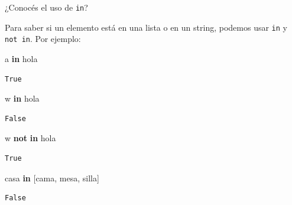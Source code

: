 \documentclass[
  letterpaper,
  DIV=11,
  numbers=noendperiod]{scrreprt}
\newenvironment{Shaded}{\begin{snugshade}}{\end{snugshade}}
\newcommand{\CommentTok}[1]{\textcolor[rgb]{0.37,0.37,0.37}{#1}}
\newcommand{\KeywordTok}[1]{\textcolor[rgb]{0.00,0.23,0.31}{\textbf{#1}}}
\newcommand{\NormalTok}[1]{\textcolor[rgb]{0.00,0.23,0.31}{#1}}
\newcommand{\StringTok}[1]{\textcolor[rgb]{0.13,0.47,0.30}{#1}}
\begin{document}
\begin{tcolorbox}[enhanced jigsaw, opacitybacktitle=0.6, toptitle=1mm, toprule=.15mm, arc=.35mm, breakable, bottomrule=.15mm, opacityback=0, leftrule=.75mm, rightrule=.15mm, title=\textcolor{quarto-callout-tip-color}{\faLightbulb}\hspace{0.5em}{Tip: \texttt{in} y \texttt{not\ in}}, left=2mm, bottomtitle=1mm, colframe=quarto-callout-tip-color-frame, colback=white, titlerule=0mm, coltitle=black, colbacktitle=quarto-callout-tip-color!10!white]

¿Conocés el uso de \texttt{in}?

Para saber si un elemento está en una lista o en un string, podemos usar
\texttt{in} y \texttt{not\ in}. Por ejemplo:

\begin{Shaded}
\begin{Highlighting}[]
\CommentTok{\textquotesingle{}a\textquotesingle{}} \KeywordTok{in} \StringTok{\textquotesingle{}hola\textquotesingle{}}
\end{Highlighting}
\end{Shaded}

\begin{verbatim}
True
\end{verbatim}

\begin{Shaded}
\begin{Highlighting}[]
\CommentTok{\textquotesingle{}w\textquotesingle{}} \KeywordTok{in} \StringTok{\textquotesingle{}hola\textquotesingle{}}
\end{Highlighting}
\end{Shaded}

\begin{verbatim}
False
\end{verbatim}

\begin{Shaded}
\begin{Highlighting}[]
\CommentTok{\textquotesingle{}w\textquotesingle{}} \KeywordTok{not} \KeywordTok{in} \StringTok{\textquotesingle{}hola\textquotesingle{}}
\end{Highlighting}
\end{Shaded}

\begin{verbatim}
True
\end{verbatim}

\begin{Shaded}
\begin{Highlighting}[]
\CommentTok{\textquotesingle{}casa\textquotesingle{}} \KeywordTok{in}\NormalTok{ [}\StringTok{\textquotesingle{}cama\textquotesingle{}}\NormalTok{, }\StringTok{\textquotesingle{}mesa\textquotesingle{}}\NormalTok{, }\StringTok{\textquotesingle{}silla\textquotesingle{}}\NormalTok{]}
\end{Highlighting}
\end{Shaded}

\begin{verbatim}
False
\end{verbatim}

\end{tcolorbox}
\end{document}
